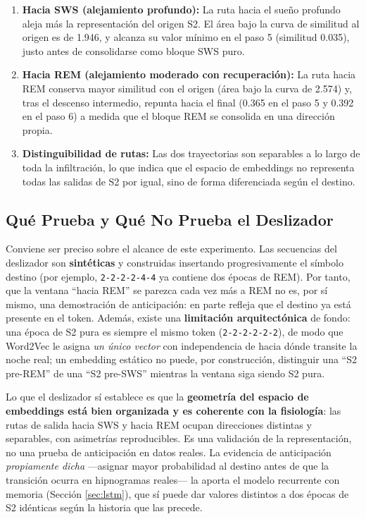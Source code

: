 \begin{enumerate}
    \item \textbf{Hacia SWS (alejamiento profundo):} La ruta hacia el sueño profundo aleja más la representación del origen S2. El área bajo la curva de similitud al origen es de 1.946, y alcanza su valor mínimo en el paso 5 (similitud 0.035), justo antes de consolidarse como bloque SWS puro.

    \item \textbf{Hacia REM (alejamiento moderado con recuperación):} La ruta hacia REM conserva mayor similitud con el origen (área bajo la curva de 2.574) y, tras el descenso intermedio, repunta hacia el final (0.365 en el paso 5 y 0.392 en el paso 6) a medida que el bloque REM se consolida en una dirección propia.

    \item \textbf{Distinguibilidad de rutas:} Las dos trayectorias son separables a lo largo de toda la infiltración, lo que indica que el espacio de embeddings no representa todas las salidas de S2 por igual, sino de forma diferenciada según el destino.
\end{enumerate}

\subsection{Qué Prueba y Qué No Prueba el Deslizador}

Conviene ser preciso sobre el alcance de este experimento. Las secuencias del deslizador son \textbf{sintéticas} y construidas insertando progresivamente el símbolo destino (por ejemplo, \texttt{2-2-2-2-4-4} ya contiene dos épocas de REM). Por tanto, que la ventana ``hacia REM'' se parezca cada vez más a REM no es, por sí mismo, una demostración de anticipación: en parte refleja que el destino ya está presente en el token. Además, existe una \textbf{limitación arquitectónica} de fondo: una época de S2 pura es siempre el mismo token (\texttt{2-2-2-2-2-2}), de modo que Word2Vec le asigna \textit{un único vector} con independencia de hacia dónde transite la noche real; un embedding estático no puede, por construcción, distinguir una ``S2 pre-REM'' de una ``S2 pre-SWS'' mientras la ventana siga siendo S2 pura.

Lo que el deslizador sí establece es que la \textbf{geometría del espacio de embeddings está bien organizada y es coherente con la fisiología}: las rutas de salida hacia SWS y hacia REM ocupan direcciones distintas y separables, con asimetrías reproducibles. Es una validación de la representación, no una prueba de anticipación en datos reales. La evidencia de anticipación \textit{propiamente dicha} ---asignar mayor probabilidad al destino antes de que la transición ocurra en hipnogramas reales--- la aporta el modelo recurrente con memoria (Sección \ref{sec:lstm}), que sí puede dar valores distintos a dos épocas de S2 idénticas según la historia que las precede.

